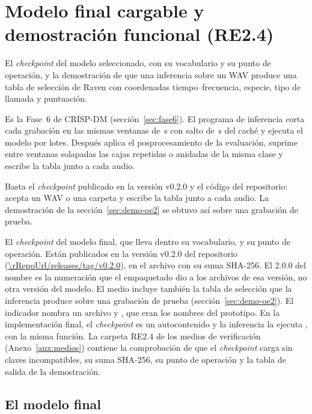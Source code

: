 \section{Modelo final cargable y demostración funcional (RE2.4)}
\label{sec:re24}

 El \textit{checkpoint} del modelo seleccionado, con su
vocabulario y su punto de operación, y la demostración de que una inferencia
sobre un WAV produce una tabla de selección de Raven con coordenadas
tiempo--frecuencia, especie, tipo de llamada y puntuación.

 Es la Fase~6 de CRISP-DM (sección~\ref{sec:fase6}). El
programa de inferencia corta cada grabación en las mismas ventanas de
\clipLen{}\,s con salto de \clipHop{}\,s del caché y ejecuta el modelo por lotes.
Después aplica el posprocesamiento de la evaluación, suprime entre ventanas
solapadas las cajas repetidas o anidadas de la misma clase y escribe la tabla
junto a cada audio.

 Basta el \textit{checkpoint} publicado en la versión
v0.2.0 y el código del repositorio:  acepta un WAV o una
carpeta y escribe la tabla junto a cada audio. La demostración de la
sección~\ref{sec:demo-oe2} se obtuvo así sobre una grabación de prueba.

 El \textit{checkpoint} del modelo final, que lleva
dentro su vocabulario, y su punto de operación. Están publicados en la versión
v0.2.0 del repositorio (\url{\rRepoUrl/releases/tag/v0.2.0}), en el archivo
 con su suma
SHA-256. El 2.0.0 del nombre es la numeración que el empaquetado dio a los archivos
de esa versión, no otra versión del modelo. El medio incluye también la tabla de
selección que la inferencia produce sobre una grabación de prueba
(sección~\ref{sec:demo-oe2}). El indicador nombra un archivo  y
, que eran los nombres del prototipo. En la implementación
final, el \textit{checkpoint} es un  autocontenido y la inferencia la
ejecuta , con la misma función. La carpeta RE2.4 de los medios de
verificación (Anexo~\ref{anx:medios}) contiene la comprobación de que el
\textit{checkpoint} carga sin claves incompatibles, su suma SHA-256, su punto de
operación y la tabla de salida de la demostración.

\subsection{El modelo final}
\label{sec:modelo-final}

